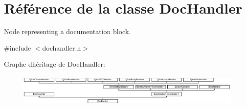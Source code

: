 \hypertarget{class_doc_handler}{}\section{Référence de la classe Doc\+Handler}
\label{class_doc_handler}


Node representing a documentation block.  




{\ttfamily \#include $<$dochandler.\+h$>$}

Graphe d\textquotesingle{}héritage de Doc\+Handler\+:\begin{figure}[H]
\begin{center}
\leavevmode
\includegraphics[height=1.600000cm]{class_doc_handler}
\end{center}
\end{figure}
